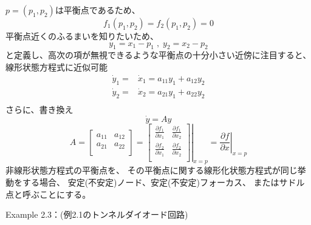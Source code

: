 \documentclass{jsarticle}
\begin{document}
$p=(p_1,p_2)$は平衡点であるため、
\begin{equation*}
  f_1(p_1,p_2)=f_2(p_1,p_2)=0
\end{equation*}
平衡点近くのふるまいを知りたいため、
\begin{equation*}
  y_1 = x_1-p_1\;,\;y_2 = x_2-p_2
\end{equation*}
と定義し、高次の項が無視できるような平衡点の十分小さい近傍に注目すると、
線形状態方程式に近似可能
\begin{align*}
  \dot y_1 = & \dot x_1 = a_{11}y_1 + a_{12}y_2\\
  \dot y_2 = & \dot x_2 = a_{21}y_1 + a_{22}y_2\\
\end{align*}
さらに、書き換え
\begin{equation*}
  \dot y = Ay
\end{equation*}
\begin{equation*}
  A = \left[
    \begin{matrix}
      a_{11} & a_{12}\\
      a_{21} & a_{22}\\
    \end{matrix}
  \right]=
  \left.\left[
    \begin{matrix}
      \frac{\partial f_1}{\partial x_1} & \frac{\partial f_1}{\partial x_2}\\
      \frac{\partial f_2}{\partial x_1} & \frac{\partial f_2}{\partial x_2}\\     
    \end{matrix}
  \right]\right|_{x=p}
  = \left.\frac{\partial f}{\partial x}\right|_{x=p}
\end{equation*}
非線形状態方程式の平衡点を、
その平衡点に関する線形化状態方程式が同じ挙動をする場合、
安定(不安定)ノード、安定(不安定)フォーカス、
またはサドル点と呼ぶことにする。

Example 2.3：(例2.1のトンネルダイオード回路)
\end{document}

